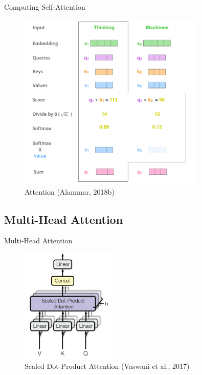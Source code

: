 \documentclass[10pt]{beamer}
\begin{document}
\begin{frame}{Computing Self-Attention}

\begin{figure}[h]
\centering
\includegraphics[width=0.8\textwidth]{fig/alammar_self-attention-output.png}
\caption{Attention (Alammar, 2018b)}
\end{figure}

\end{frame}


\subsection{Multi-Head Attention}

\begin{frame}{Multi-Head Attention}

\begin{figure}[h]
\centering
\includegraphics[width=0.4\textwidth]{fig/Vaswani_2_multi_head.png}
\caption{Scaled Dot-Product Attention (Vaswani et al., 2017)}
\end{figure}

\end{frame}
\end{document}

